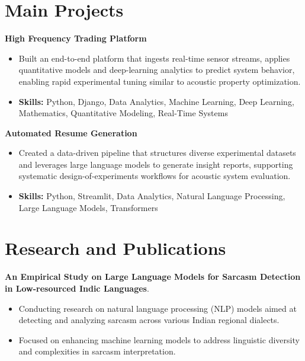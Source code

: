 \documentclass[a4paper,11pt]{article}
\begin{document}
\section{\textbf{Main Projects}}

\vspace{1mm}
  \textbf{High Frequency Trading Platform  }
\vspace{-1.5mm} %
\begin{itemize}
  \item Built an end-to-end platform that ingests real-time sensor streams, applies quantitative models and deep-learning analytics to predict system behavior, enabling rapid experimental tuning similar to acoustic property optimization.
\vspace{-3mm}
  \item \textbf{Skills:} Python, Django, Data Analytics, Machine Learning, Deep Learning, Mathematics, Quantitative Modeling, Real-Time Systems
\end{itemize}


\vspace{1mm}
   \textbf{Automated Resume Generation }
\vspace{-1.5mm} %
\begin{itemize}
  \item Created a data-driven pipeline that structures diverse experimental datasets and leverages large language models to generate insight reports, supporting systematic design-of-experiments workflows for acoustic system evaluation.
\vspace{-3mm}
  \item \textbf{Skills:} Python, Streamlit, Data Analytics, Natural Language Processing, Large Language Models, Transformers
\end{itemize}



\section{\textbf{Research and Publications} \hfill }
\vspace{1mm}
  \textbf{An Empirical Study on Large Language Models for Sarcasm Detection in Low-resourced Indic Languages}.
\vspace{-1mm} %
\begin{itemize}
  \item Conducting research on natural language processing (NLP) models aimed at detecting and analyzing sarcasm across various Indian regional dialects.
\vspace{-3mm}
  \item Focused on enhancing machine learning models to address linguistic diversity and complexities in sarcasm interpretation.
\end{itemize}
\end{document}
